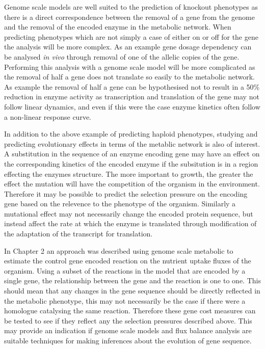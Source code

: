 Genome scale models are well suited to the prediction of knockout phenotypes as there is a direct correspondence between the removal of a gene from the genome and the removal of the encoded enzyme in the metabolic network. When predicting phenotypes which are not simply a case of either on or off for the gene the analysis will be more complex. As an example gene dosage dependency can be analysed \emph{in vivo} through removal of one of the allelic copies of the gene. Performing this analysis with a genome scale model will be more complicated as the removal of half a gene does not translate so easily to the metabolic network. As example the removal of half a gene can be hypothesised not to result in a 50\% reduction in enzyme activity as transcription and translation of the gene may not follow linear dynamics, and even if this were the case enzyme kinetics often follow a non-linear response curve.

In addition to the above example of predicting haploid phenotypes, studying and predicting evolutionary effects in terms of the metablic network is also of interest. A substitution in the sequence of an enzyme encoding gene may have an effect on the corresponding kinetics of the encoded enzyme if the subsitution is in a region effecting the enzymes structure. The more important to growth, the greater the effect the mutation will have the competition of the organism in the environment. Therefore it may be possible to predict the selection pressure on the encoding gene based on the relevence to the phenotype of the organism. Similarly a mutational effect may not necessarily change the encoded protein sequence, but instead affect the rate at which the enzyme is translated through modification of the adaptation of the transcript for translation.

In Chapter 2 an approach was described using genome scale metabolic to estimate the control gene encoded reaction on the nutrient uptake fluxes of the organism. Using a subset of the reactions in the model that are encoded by a single gene, the relationship between the gene and the reaction is one to one. This should mean that any changes in the gene sequence should be directly reflected in the metabolic phenotype, this may not necessarily be the case if there were a homologue catalysing the same reaction. Therefore these gene cost measures can be tested to see if they reflect any the selection pressures described above. This may provide an indication if genome scale models and flux balance analysis are suitable techniques for making inferences about the evolution of gene sequence.

